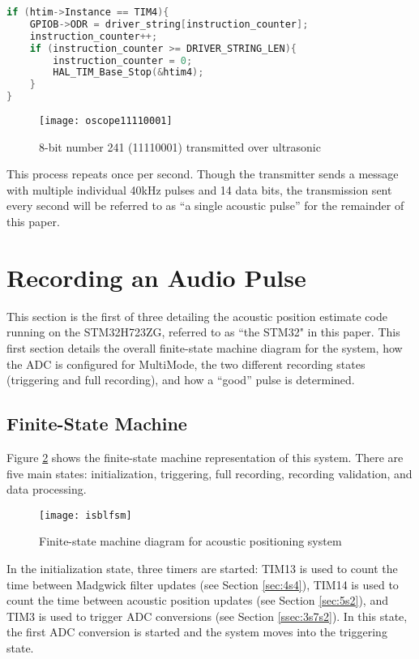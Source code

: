 \documentclass[11pt]{ucthesisCP}
\begin{document}
\begin{lstlisting}[language=C++]
if (htim->Instance == TIM4){
	GPIOB->ODR = driver_string[instruction_counter]; 
	instruction_counter++;
	if (instruction_counter >= DRIVER_STRING_LEN){
		instruction_counter = 0;
		HAL_TIM_Base_Stop(&htim4);
	}
}
\end{lstlisting}

\begin{figure}[htbp]
	\centering
	\texttt{[image: oscope11110001]}
	\caption{8-bit number 241 (11110001) transmitted over ultrasonic}
	\label{fig:oscope11110001}
\end{figure}

This process repeats once per second. Though the transmitter sends a message with multiple individual 40kHz pulses and 14 data bits, the transmission sent every second will be referred to as “a single acoustic pulse” for the remainder of this paper.

\section{Recording an Audio Pulse} \label{sec:3s7}
This section is the first of three detailing the acoustic position estimate code running on the STM32H723ZG, referred to as ``the STM32" in this paper. This first section details the overall finite-state machine diagram for the system, how the ADC is configured for MultiMode, the two different recording states (triggering and full recording), and how a “good” pulse is determined.

\subsection{Finite-State Machine} \label{ssec:3s7s1}
Figure \ref{fig:isblfsm} shows the finite-state machine representation of this system. There are five main states: initialization, triggering, full recording, recording validation, and data processing.

\begin{figure}[htbp]
	\centering
	\texttt{[image: isblfsm]}
	\caption{Finite-state machine diagram for acoustic positioning system}
	\label{fig:isblfsm}
\end{figure}

In the initialization state, three timers are started: TIM13 is used to count the time between Madgwick filter updates (see Section \ref{sec:4s4}), TIM14 is used to count the time between acoustic position updates (see Section \ref{sec:5s2}), and TIM3 is used to trigger ADC conversions (see Section \ref{ssec:3s7s2}). In this state, the first ADC conversion is started and the system moves into the triggering state.
\end{document}
